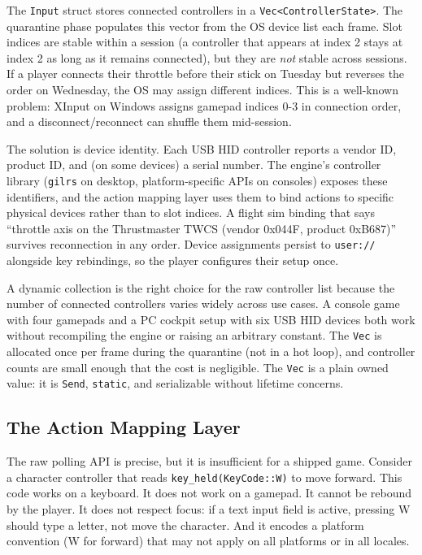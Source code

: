 \documentclass[
  11pt,
  letterpaper,
  DIV=11,
  numbers=noendperiod,
  twoside,
  open=right]{scrreprt}
\begin{document}
The \texttt{Input} struct stores connected controllers in a
\texttt{Vec\textless{}ControllerState\textgreater{}}. The quarantine
phase populates this vector from the OS device list each frame. Slot
indices are stable within a session (a controller that appears at index
2 stays at index 2 as long as it remains connected), but they are
\emph{not} stable across sessions. If a player connects their throttle
before their stick on Tuesday but reverses the order on Wednesday, the
OS may assign different indices. This is a well-known problem: XInput on
Windows assigns gamepad indices 0-3 in connection order, and a
disconnect/reconnect can shuffle them mid-session.

The solution is device identity. Each USB HID controller reports a
vendor ID, product ID, and (on some devices) a serial number. The
engine's controller library (\texttt{gilrs} on desktop,
platform-specific APIs on consoles) exposes these identifiers, and the
action mapping layer uses them to bind actions to specific physical
devices rather than to slot indices. A flight sim binding that says
``throttle axis on the Thrustmaster TWCS (vendor 0x044F, product
0xB687)'' survives reconnection in any order. Device assignments persist
to \texttt{user://} alongside key rebindings, so the player configures
their setup once.

A dynamic collection is the right choice for the raw controller list
because the number of connected controllers varies widely across use
cases. A console game with four gamepads and a PC cockpit setup with six
USB HID devices both work without recompiling the engine or raising an
arbitrary constant. The \texttt{Vec} is allocated once per frame during
the quarantine (not in a hot loop), and controller counts are small
enough that the cost is negligible. The \texttt{Vec} is a plain owned
value: it is \texttt{Send}, \texttt{\textquotesingle{}static}, and
serializable without lifetime concerns.

\subsection{The Action Mapping Layer}\label{the-action-mapping-layer}

The raw polling API is precise, but it is insufficient for a shipped
game. Consider a character controller that reads
\texttt{key\_held(KeyCode::W)} to move forward. This code works on a
keyboard. It does not work on a gamepad. It cannot be rebound by the
player. It does not respect focus: if a text input field is active,
pressing W should type a letter, not move the character. And it encodes
a platform convention (W for forward) that may not apply on all
platforms or in all locales.
\end{document}
